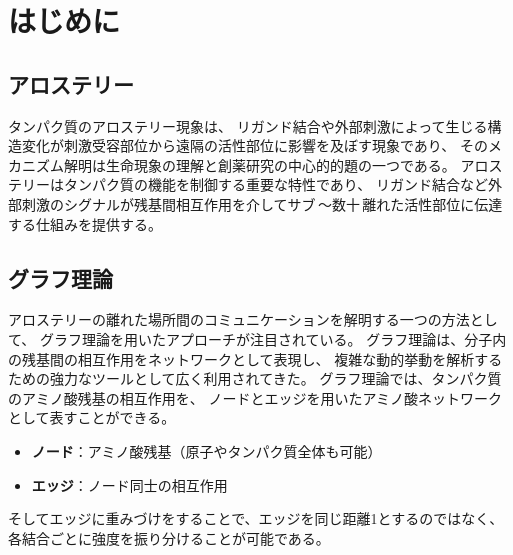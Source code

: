 \section{はじめに}

\subsection{アロステリー}
タンパク質のアロステリー現象は、
リガンド結合や外部刺激によって生じる構造変化が刺激受容部位から遠隔の活性部位に影響を及ぼす現象であり、
そのメカニズム解明は生命現象の理解と創薬研究の中心的的題の一つである。
アロステリーはタンパク質の機能を制御する重要な特性であり\cite{Cui2009}、
リガンド結合など外部刺激のシグナルが残基間相互作用を介してサブ\,\text{\AA}～数十\,\text{\AA}離れた活性部位に伝達する仕組みを提供する。

\subsection{グラフ理論}
アロステリーの離れた場所間のコミュニケーションを解明する一つの方法として、
グラフ理論\cite{Zhou2018}を用いたアプローチが注目されている。
グラフ理論は、分子内の残基間の相互作用をネットワークとして表現し、
複雑な動的挙動を解析するための強力なツールとして広く利用されてきた\cite{Doncheva2011}\cite{Martin2011}\cite{Doncheva2012}。
グラフ理論では、タンパク質のアミノ酸残基の相互作用を、
ノードとエッジを用いたアミノ酸ネットワークとして表すことができる。
\begin{itemize}
  \item \textbf{ノード}：アミノ酸残基（原子やタンパク質全体も可能）
  \item \textbf{エッジ}：ノード同士の相互作用
\end{itemize}

そしてエッジに重みづけをすることで、エッジを同じ距離1とするのではなく、
各結合ごとに強度を振り分けることが可能である。

